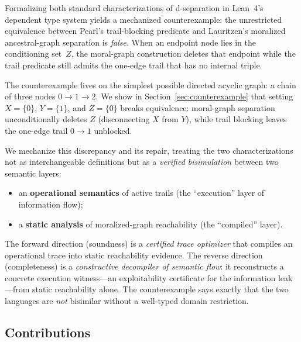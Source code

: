 \documentclass[acmsmall,screen,nonacm]{acmart}
\begin{document}
Formalizing both standard characterizations of d-separation in
Lean~4's dependent type system yields a mechanized counterexample: the
unrestricted equivalence between Pearl's trail-blocking predicate and
Lauritzen's moralized ancestral-graph separation is \emph{false}.  When an
endpoint node lies in the conditioning set~$Z$, the moral-graph construction
deletes that endpoint while the trail predicate still admits the one-edge trail
that has no internal triple.

The counterexample lives on the simplest possible directed acyclic graph: a chain of three nodes
$0 \to 1 \to 2$. We show in Section~\ref{sec:counterexample} that setting $X = \{0\}$, $Y = \{1\}$, and $Z = \{0\}$ breaks equivalence: moral-graph separation unconditionally deletes $Z$ (disconnecting $X$ from $Y$), while trail blocking leaves the one-edge trail $0 \to 1$ unblocked.

We mechanize this discrepancy and its repair, treating the two
characterizations not as interchangeable definitions but as a \emph{verified
bisimulation} between two semantic layers:
\begin{itemize}
  \item an \textbf{operational semantics} of active trails (the ``execution''
    layer of information flow);
  \item a \textbf{static analysis} of moralized-graph reachability (the
    ``compiled'' layer).
\end{itemize}
The forward direction (soundness) is a \emph{certified trace optimizer}
that compiles an operational trace into static reachability evidence.  The
reverse direction (completeness) is a \emph{constructive decompiler of semantic
flow}: it reconstructs a concrete execution witness---an exploitability
certificate for the information leak---from static reachability alone.  The
counterexample says exactly that the two languages are \emph{not} bisimilar
without a well-typed domain restriction.

\subsection{Contributions}
\end{document}
